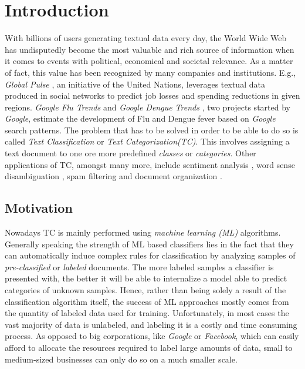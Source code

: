 
\chapter{Introduction}
\label{ch:Introduction}

With billions of users generating textual data every day, the World
Wide Web has undisputedly become the most valuable and rich source
of information when it comes to events with political, economical and
societal relevance. As a matter of fact, this value has been recognized by
many companies and institutions. E.g., \emph{Global Pulse} \cite{globalpulse},
an initiative of the United Nations, leverages textual data produced in social networks to predict job
losses and spending reductions in given regions.
\emph{Google Flu Trends} and \emph{Google Dengue Trends} \cite{googlefludengue},
two projects started by \emph{Google}, estimate the development of Flu and Dengue fever based on \emph{Google} search
patterns. The problem that has to be solved in order to
be able to do so is called \emph{Text Classification} or \emph{Text Categorization(TC)}. This involves
assigning a text document to one ore more predefined \emph{classes} or \emph{categories}. 
Other applications of TC, amongst many more, include sentiment analysis
\cite{pang2002thumbs, pang2008opinion}, word sense disambiguation
\cite{stevenson2003word}, spam filtering and document organization
\cite{leuski2001evaluating, sebastiani2002machine}.

\section{Motivation}
\label{sec:Motivation}
Nowadays TC is mainly performed using \emph{machine learning (ML)} algorithms.
Generally speaking the strength of ML based classifiers lies in the fact
that they can automatically induce complex rules for classification by
analyzing samples of \textit{pre-classified} or \textit{labeled} documents. 
The more labeled samples a classifier is presented with, the better it will be
able to internalize a model able to predict categories of unknown samples. 
Hence, rather than being solely a result of the classification algorithm itself,
the success of ML approaches mostly comes from the quantity of labeled
data used for training. Unfortunately, in most cases the vast majority of
data is unlabeled, and labeling it is a costly and time consuming process. 
As opposed to big corporations, like \emph{Google} or \emph{Facebook}, which can
easily afford to allocate the resources required to label large amounts of data, 
small to medium-sized businesses can only do so on a much smaller scale. 


